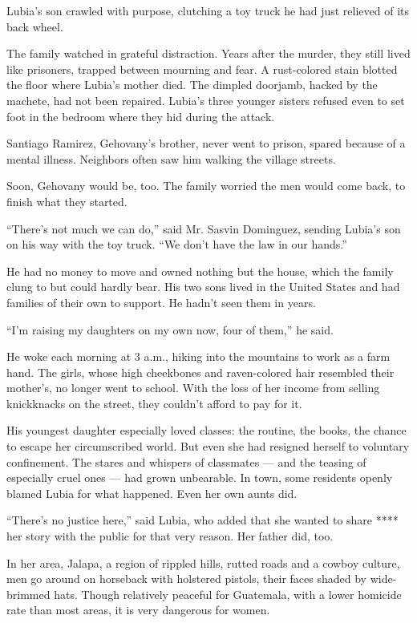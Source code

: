 Lubia's son crawled with purpose, clutching a toy truck he had just
relieved of its back wheel.

The family watched in grateful distraction. Years after the murder, they
still lived like prisoners, trapped between mourning and fear. A
rust-colored stain blotted the floor where Lubia's mother died. The
dimpled doorjamb, hacked by the machete, had not been repaired. Lubia's
three younger sisters refused even to set foot in the bedroom where they
hid during the attack.

Santiago Ramirez, Gehovany's brother, never went to prison, spared
because of a mental illness. Neighbors often saw him walking the village
streets.

Soon, Gehovany would be, too. The family worried the men would come
back, to finish what they started.

``There's not much we can do,'' said Mr. Sasvin Dominguez, sending
Lubia's son on his way with the toy truck. ``We don't have the law in
our hands.''

He had no money to move and owned nothing but the house, which the
family clung to but could hardly bear. His two sons lived in the United
States and had families of their own to support. He hadn't seen them in
years.

``I'm raising my daughters on my own now, four of them,'' he said.

He woke each morning at 3 a.m., hiking into the mountains to work as a
farm hand. The girls, whose high cheekbones and raven-colored hair
resembled their mother's, no longer went to school. With the loss of her
income from selling knickknacks on the street, they couldn't afford to
pay for it.

His youngest daughter especially loved classes: the routine, the books,
the chance to escape her circumscribed world. But even she had resigned
herself to voluntary confinement. The stares and whispers of classmates
--- and the teasing of especially cruel ones --- had grown unbearable.
In town, some residents openly blamed Lubia for what happened. Even her
own aunts did.

``There's no justice here,'' said Lubia, who added that she wanted to
share **** her story with the public for that very reason. Her father
did, too.

In her area, Jalapa, a region of rippled hills, rutted roads and a
cowboy culture, men go around on horseback with holstered pistols, their
faces shaded by wide-brimmed hats. Though relatively peaceful for
Guatemala, with a lower homicide rate than most areas, it is very
dangerous for women.

